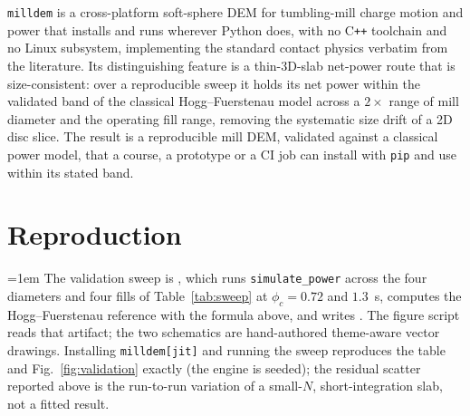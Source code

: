 \documentclass[journal]{IEEEtran}
\begin{document}
\texttt{milldem} is a cross-platform soft-sphere DEM for tumbling-mill charge motion and power that installs and
runs wherever Python does, with no C\texttt{++} toolchain and no Linux subsystem, implementing the standard
contact physics verbatim from the literature. Its distinguishing feature is a thin-3D-slab net-power route that
is size-consistent: over a reproducible sweep it holds its net power within the validated band of the classical
Hogg--Fuerstenau model across a $2\times$ range of mill diameter and the operating fill range, removing the
systematic size drift of a 2D disc slice. The result is a reproducible mill DEM, validated against a
classical power model, that a course, a prototype or a CI job can install with \texttt{pip} and use within its
stated band.

\appendices
\section{Reproduction}\label{app:repro}

{\raggedright\parindent=1em
The validation sweep is , which runs
\texttt{simulate\_power} across the four diameters and four fills of Table~\ref{tab:sweep} at $\phi_c=0.72$ and
$1.3$~s, computes the Hogg--Fuerstenau reference with the formula above, and writes
. The figure script reads that artifact; the two schematics are hand-authored
theme-aware vector drawings. Installing \texttt{milldem[jit]} and running the sweep reproduces the table and
Fig.~\ref{fig:validation} exactly (the engine is seeded); the residual scatter reported above is the
run-to-run variation of a small-$N$, short-integration slab, not a fitted result.\par}

\balance
\end{document}
